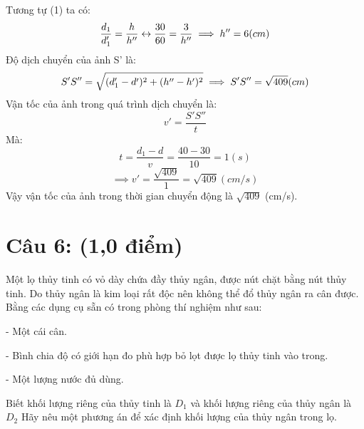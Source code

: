 \documentclass[50pt]{article}
\begin{document}
Tương tự (1)  ta có:
\begin{equation*}
    \dfrac{d_{1}}{d_{1}'} = \dfrac{h}{h''} \leftrightarrow \dfrac{30}{60} = \dfrac{3}{h''}\\
    \implies h'' = 6 (cm)
\end{equation*}
Độ dịch chuyển của ảnh S' là:\\
\begin{equation*}
    S'S'' = \sqrt{(d_{1}' - d')^2 + (h'' - h')^2}\\
    \implies S'S'' = \sqrt{409} (cm)\\
\end{equation*}
Vận tốc của ảnh trong quá trình dịch chuyển là:\\
\begin{equation*}
    v' = \dfrac{S'S''}{t}
\end{equation*}
Mà:
\begin{equation*}
    t = \dfrac{d_{1} - d}{v} = \dfrac{40 - 30}{10} = 1 (s)
\end{equation*}
\begin{equation*}
    \implies v' = \dfrac{\sqrt{409}}{1} = \sqrt{409} (cm/s)
\end{equation*}
Vậy vận tốc của ảnh trong thời gian chuyển động là $\sqrt{409}$ (cm/s).
\section*{\color[HTML]{4287f5}Câu 6: (1,0 điểm)}
Một lọ thủy tinh có vỏ dày chứa đầy thủy ngân, được nút chặt bằng nút thủy tinh. Do thủy ngân là kim loại rất độc nên không thể đổ thủy ngân ra cân được. Bằng các dụng cụ sẵn có trong phòng thí nghiệm như sau:

- Một cái cân.

- Bình chia độ có giới hạn đo phù hợp bỏ lọt được lọ thủy tinh vào trong.

- Một lượng nước đủ dùng.

Biết khối lượng riêng của thủy tinh là $D_{1}$ và khối lượng riêng của thủy ngân là $D_{2}$ Hãy nêu một phương án để xác định khối lượng của thủy ngân trong lọ.
\end{document}
